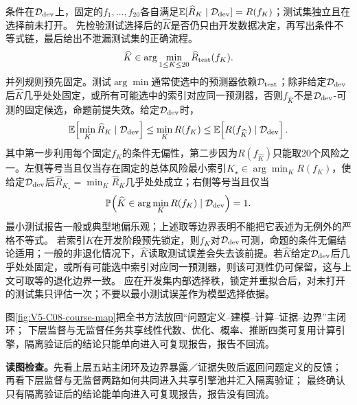 \begin{solution}
\SolGiven 条件在$\mathcal D_{\rm dev}$上，固定的$f_1,\ldots,f_{20}$各自满足$\mathbb E[\widehat R_K\mid\mathcal D_{\rm dev}]=R(f_K)$；测试集独立且在选择前未打开。
\SolPlan 先检验测试选择后的$\widehat K$是否仍只由开发数据决定，再写出条件不等式链，最后给出不泄漏测试集的正确流程。
\SolDerive
\[
\widehat K\in\arg\min_{1\le K\le20}\widehat R_{\rm test}(f_K).
\]
并列规则预先固定。测试$\arg\min$通常使选中的预测器依赖$\mathcal D_{\rm test}$；除非给定$\mathcal D_{\rm dev}$后$\widehat K$几乎处处固定，或所有可能选中的索引对应同一预测器，否则$f_{\widehat K}$不是$\mathcal D_{\rm dev}$-可测的固定候选，命题前提失效。给定$\mathcal D_{\rm dev}$时，
\[
\mathbb E\!\left[\min_K\widehat R_K\mid\mathcal D_{\rm dev}\right]
\le \min_K R(f_K)
\le \mathbb E\!\left[R(f_{\widehat K})\mid\mathcal D_{\rm dev}\right].
\]
其中第一步利用每个固定$f_K$的条件无偏性，第二步因为$R(f_{\widehat K})$只能取20个风险之一。左侧等号当且仅当存在固定的总体风险最小索引$K_\star\in\arg\min_K R(f_K)$，使给定$\mathcal D_{\rm dev}$后$\widehat R_{K_\star}=\min_K\widehat R_K$几乎处处成立；右侧等号当且仅当
\[
\mathbb P\!\left(\widehat K\in\arg\min_K R(f_K)\mid\mathcal D_{\rm dev}\right)=1.
\]
最小测试报告一般或典型地偏乐观；上述取等边界表明不能把它表述为无例外的严格不等式。
\SolCheck 若索引$K$在开发阶段预先锁定，则$f_K$对$\mathcal D_{\rm dev}$可测，命题的条件无偏结论适用；一般的非退化情况下，$\widehat K$读取测试误差会失去该前提。若$\widehat K$给定$\mathcal D_{\rm dev}$后几乎处处固定，或所有可能选中索引对应同一预测器，则该可测性仍可保留，这与上文可取等的退化边界一致。
\SolAnswer 应在开发集内部选择秩，锁定并重拟合后，对未打开的测试集只评估一次；不要以最小测试误差作为模型选择依据。
\end{solution}

图\ref{fig:V5-C08-course-map}把全书方法放回“问题定义--建模--计算--证据--边界”主闭环；
下层监督与无监督任务共享线性代数、优化、概率、推断四类可复用计算引擎，隔离验证后的结论只能单向进入可复现报告，报告不回流。

\FloatBarrier
\noindent\textbf{读图检查。}先看上层五站主闭环及边界暴露／证据失败后返回问题定义的反馈；
再看下层监督与无监督两路如何共同进入共享引擎池并汇入隔离验证；
最终确认只有隔离验证后的结论能单向进入可复现报告，报告没有回流。

